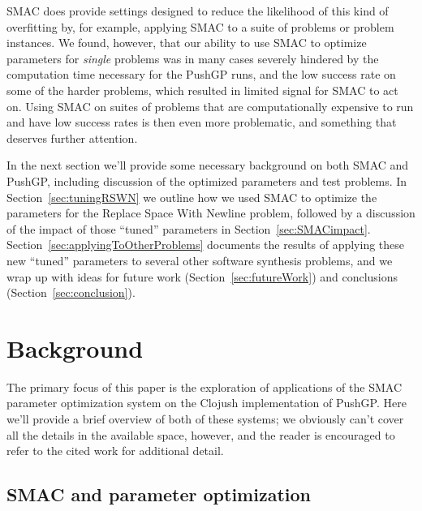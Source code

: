 SMAC does provide settings designed to reduce the likelihood of this kind of
overfitting by, for example, applying SMAC to a suite of problems or problem
instances. We found, however, that
our ability to use SMAC to optimize parameters for \emph{single} problems
was in many cases severely
hindered by the computation time necessary for the PushGP runs, and the low
success rate on some of the harder problems, which resulted in limited
signal for SMAC to act on. Using SMAC on suites of problems that are
computationally expensive to run and have low success rates is then even
more problematic, and something that deserves further attention.

In the next section we'll provide some necessary background on both SMAC
and PushGP, including discussion of the optimized parameters and test
problems. In Section~\ref{sec:tuningRSWN} we outline how we 
used SMAC to optimize the parameters for the Replace Space With Newline
problem, followed by a discussion of the impact of those ``tuned''
parameters in Section~\ref{sec:SMACimpact}. 
Section~\ref{sec:applyingToOtherProblems} documents the results of
applying these new ``tuned'' parameters to several other software
synthesis problems, and we wrap up with ideas for future work
(Section~\ref{sec:futureWork}) and conclusions (Section~\ref{sec:conclusion}).

\section{Background}
\label{sec:background}

The primary focus of this paper is the exploration of applications of the SMAC
parameter optimization system on the Clojush implementation of
PushGP. Here we'll provide a brief overview of both of these systems; we
obviously can't cover all the details in the available space, however, and the
reader is encouraged to refer to the cited work for additional detail.

\subsection{SMAC and parameter optimization}
\label{sec:SMACbackground}

